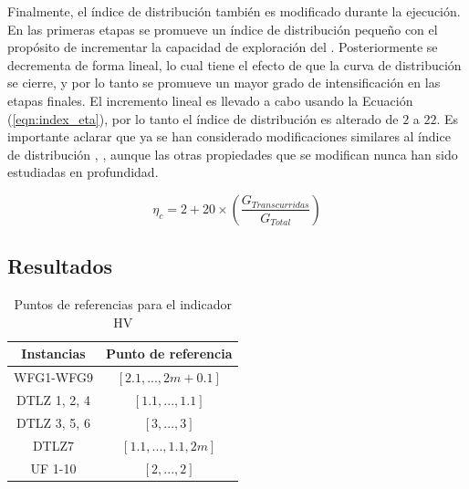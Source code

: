 Finalmente, el índice de distribución también es modificado durante la ejecución.
%
En las primeras etapas se promueve un índice de distribución pequeño con el propósito de incrementar la capacidad de exploración del \SBX{}.
%
Posteriormente se decrementa de forma lineal, lo cual tiene el efecto de que la curva de distribución se cierre, y por lo tanto se promueve 
un mayor grado de intensificación en las etapas finales.
%
El incremento lineal es llevado a cabo usando la Ecuación (\ref{eqn:index_eta}), por lo tanto el índice de distribución es alterado de $2$ a $22$.
%
Es importante aclarar que ya se han considerado modificaciones similares al índice de distribución \cite{zitzler1999multiobjective}, \cite{hamdan2012distribution},
aunque las otras propiedades que se modifican nunca han sido estudiadas en profundidad.

\begin{equation}\label{eqn:index_eta}
 \eta_c = 2 + 20 \times \left ( \frac{G_{Transcurridas}}{G_{Total}} \right)
\end{equation}

\subsection{Resultados}

\begin{table}[t]
\centering
\caption{Puntos de referencias para el indicador HV}
\label{tab:ReferencePoints}
\begin{scriptsize}
\begin{tabular}{cc}
\hline
\textbf{Instancias} & \textbf{Punto de referencia} \\ \hline
WFG1-WFG9 & $[2.1, ...,2m+0.1]$ \\
DTLZ 1, 2, 4 & $[1.1, ..., 1.1]$ \\
DTLZ 3, 5, 6 & $[3, ..., 3]$ \\
DTLZ7 & $[1.1, ..., 1.1, 2m]$ \\
UF 1-10 & $[2, ..., 2]$ \\ \hline
\end{tabular}
\end{scriptsize}
\end{table}


